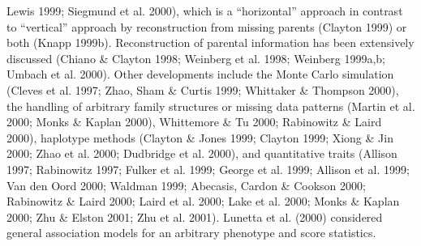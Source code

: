 Lewis 1999; Siegmund et al.  2000), which is a ``horizontal'' approach in
contrast to ``vertical'' approach by reconstruction from missing parents
(Clayton 1999) or both (Knapp 1999b).  Reconstruction of parental information
has been extensively discussed (Chiano \& Clayton 1998; Weinberg et al.  1998;
Weinberg 1999a,b; Umbach et al.  2000).  Other developments include the Monte
Carlo simulation (Cleves et al.  1997; Zhao, Sham \& Curtis 1999; Whittaker \&
Thompson 2000), the handling of arbitrary family structures or missing data
patterns (Martin et al.  2000; Monks \& Kaplan 2000), Whittemore \& Tu 2000;
Rabinowitz \& Laird 2000), haplotype methods (Clayton \& Jones 1999; Clayton
1999; Xiong \& Jin 2000; Zhao et al.  2000; Dudbridge et al.  2000), and
quantitative traits (Allison 1997; Rabinowitz 1997; Fulker et al.  1999; George
et al.  1999; Allison et al.  1999; Van den Oord 2000; Waldman 1999; Abecasis,
Cardon \& Cookson 2000; Rabinowitz \& Laird 2000; Laird et al.  2000; Lake et
al.  2000; Monks \& Kaplan 2000; Zhu \& Elston 2001; Zhu et al.  2001).
Lunetta et al.  (2000) considered general association models for an arbitrary
phenotype and score statistics.

